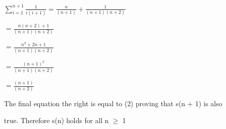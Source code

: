 \documentclass[12pt]{article}
\begin{document}
$\sum_{i=1}^{n + 1}\frac{1}{i(i + 1)} = \frac{n}{(n + 1)} + \frac{1}{(n + 1)(n + 2)}$\par

\vspace{5mm} %

\hfil $=  \frac{n(n + 2) + 1}{(n + 1)(n + 2)}$\par

\vspace{5mm} %

\hfil $=  \frac{n^2 + 2n + 1}{(n + 1)(n + 2)}$\par

\vspace{5mm} %

\hfil $=  \frac{(n + 1)^2}{(n + 1)(n + 2)}$\par

\vspace{5mm} %

\hfil $=  \frac{(n + 1)}{(n + 2)}$\par

\vspace{5mm} %

The final equation the right is equal to (2) proving that s(n + 1) is also\par true.
Therefore s(n) holds for all n $\geq$ 1
\end{document}
